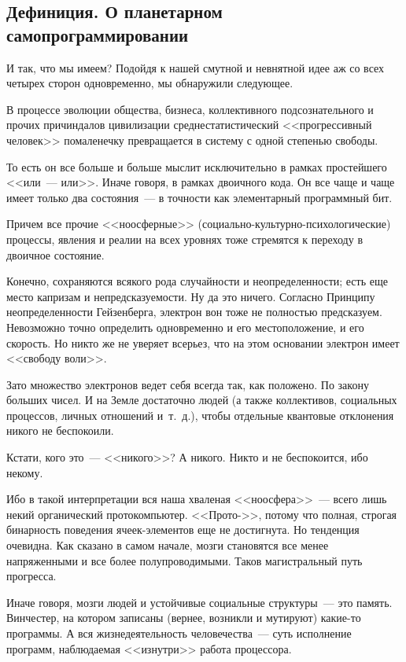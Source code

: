 \documentclass{scrbook}
\newcommand{\flqq}{<<}
\newcommand{\frqq}{>>}
\newcommand{\mdash}{~--- }
\newcommand{\essaysection}[1]{\subsection*{#1}\nopagebreak}
\begin{document}
\essaysection{Дефиниция. О планетарном самопрограммировании}

И так, что мы имеем? Подойдя к нашей смутной и невнятной идее аж со всех четырех сторон одновременно, мы обнаружили следующее.

В процессе эволюции общества, бизнеса, коллективного подсознательного и прочих причиндалов цивилизации среднестатистический {\flqq}прогрессивный человек{\frqq} помаленечку превращается в систему с одной степенью свободы.

То есть он все больше и больше мыслит исключительно в рамках простейшего {\flqq}или{\mdash}или{\frqq}. Иначе говоря, в рамках двоичного кода. Он все чаще и чаще имеет только два состояния{\mdash}в точности как элементарный программный бит.

Причем все прочие {\flqq}ноосферные{\frqq} (социально-культурно-психологические) процессы, явления и реалии на всех уровнях тоже стремятся к переходу в двоичное состояние.

Конечно, сохраняются всякого рода случайности и неопределенности; есть еще место капризам и непредсказуемости. Ну да это ничего. Согласно Принципу неопределенности Гейзенберга, электрон вон тоже не полностью предсказуем. Невозможно точно определить одновременно и его местоположение, и его скорость. Но никто же не уверяет всерьез, что на этом основании электрон имеет {\flqq}свободу воли{\frqq}.

Зато множество электронов ведет себя всегда так, как положено. По закону больших чисел. И на Земле достаточно людей (а также коллективов, социальных процессов, личных отношений и~т.~д.), чтобы отдельные квантовые отклонения никого не беспокоили.

Кстати, кого это{\mdash}{\flqq}никого{\frqq}? А никого. Никто и не беспокоится, ибо некому.

Ибо в такой интерпретации вся наша хваленая {\flqq}ноосфера{\frqq}{\mdash}всего лишь некий органический протокомпьютер. {\flqq}Прото-{\frqq}, потому что полная, строгая бинарность поведения ячеек-элементов еще не достигнута. Но тенденция очевидна. Как сказано в самом начале, мозги становятся все менее напряженными и все более полупроводимыми. Таков магистральный путь прогресса.

Иначе говоря, мозги людей и устойчивые социальные структуры{\mdash}это память. Винчестер, на котором записаны (вернее, возникли и мутируют) какие-то программы. А вся жизнедеятельность человечества{\mdash}суть исполнение программ, наблюдаемая {\flqq}изнутри{\frqq} работа процессора.
\end{document}
